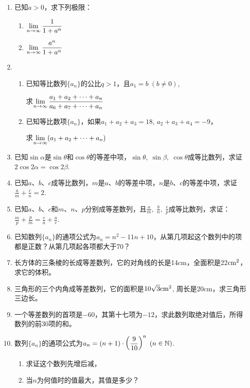 \begin{enumerate}
\item 已知$a>0$，求下列极限：
\begin{multicols}{2}
\begin{enumerate}[(1)]
    \item $\lim\limits_{n\to \infty}\dfrac{1}{1+a^n}$
    \item $\lim\limits_{n\to \infty}\dfrac{a^n}{1+a^n}$
\end{enumerate}
\end{multicols}

\item \begin{enumerate}[(1)]
\item 已知等比数列$\{a_n\}$的公比$q>1$，且$a_1=b\; (b\ne 0)$, 

求$\lim\limits_{n\to \infty}\dfrac{a_1+a_2+\cdots+a_n}{a_6+a_7+\cdots+a_n}$
\item 已知等比数项$\{a_n\}$，如果$a_1+a_2+a_3=18$, $a_2+a_3+a_4=-9$，

求$\lim\limits_{n\to \infty}(a_1+a_2+\cdots+a_n)$
\end{enumerate}

\item 已知$\sin\alpha$是$\sin\theta$和$\cos\theta$的等差中项，$\sin\theta,\; \sin\beta,\; \cos\theta$成等比数列，求证$2\cos2\alpha=\cos2\beta$.
\item 已知$a$、$b$、$c$成等比数列，$m$是$a$、$b$的等差中项，$n$是$b$、$c$的等差中项，求证$\frac{a}{m}+\frac{c}{n}=2$.
\item 已知$a$、$b$、$c$和$m$、$n$、$p$分别成等差数列，且$\frac{a}{m},\; \frac{b}{n},\; \frac{c}{p}$成等比数列，求证：$\frac{m}{p}+\frac{p}{m}=\frac{c}{a}+\frac{a}{c}$.

\item 已知数列$\{a_n\}$的通项公式为$a_n=n^2-11n+10$，从第几项起这个数列中的项都是正数？从第几项起各项都大于70？
\item 长方体的三条棱的长成等差数列，它的对角线的长是14cm，全面积是22${\rm cm^2}$，求它的体积。
\item 三角形的三个内角成等差数列，它的面积是$10\sqrt{3}{\rm cm}^2$, 周长是20cm，求三角形三边长。
\item 一个等差数列的首项是$-60$，其第十七项为$-12$，求此数列取绝对值后，所得数列的前30项的和。
\item 数列$\{a_n\}$的通项公式为$a_n=(n+1)\cdot \left(\dfrac{9}{10}\right)^n\; (n\in\mathbb{N})$.
\begin{enumerate}[(1)]
\item 求证这个数列先增后减，
\item 当$n$为何值时的值最大，其值是多少？
\end{enumerate}


\end{enumerate}
